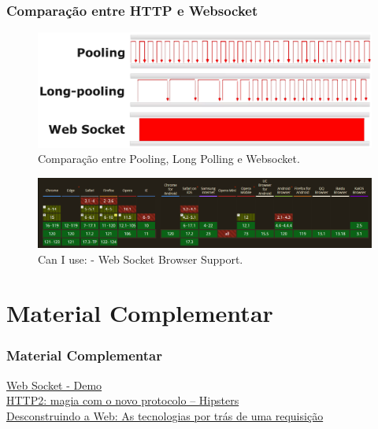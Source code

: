 \documentclass[
	10pt, %
	t, %
]{beamer}
\begin{document}
\begin{frame}
	\frametitle{Comparação entre HTTP e Websocket}

	\begin{figure}
		\centering
		\includegraphics[width=0.8\linewidth]{po_lp_ws.png}
		\caption{Comparação entre Pooling, Long Polling e Websocket.}
		\label{fig:websocket_example2}
	\end{figure}

	\begin{figure}
		\centering
		\includegraphics[width=0.8\linewidth]{ws_support.png}
		\caption{Can I use: - Web Socket Browser Support.}
		\label{fig:websocket_support}
	\end{figure}

\end{frame}

\section{Material Complementar}

\begin{frame}
	\frametitle{Material Complementar}

	\href{https://codepen.io/matt-west/pen/nYvVBV}{\faLink \hspace{0.2em} Web Socket - Demo}\\
	\href{https://www.hipsters.tech/http2-magia-com-o-novo-protocolo}{\faPodcast \hspace{0.2em} HTTP2: magia com o novo protocolo – Hipsters}\\
	\href{https://www.casadocodigo.com.br/products/livro-desconstruindo-web}{\faBook \hspace{0.2em} Desconstruindo a Web: As tecnologias por trás de uma requisição}\\

\end{frame}
\end{document}
